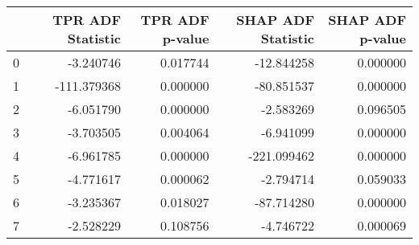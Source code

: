 \begin{tabular}{lrrrr}
\toprule
 & TPR ADF Statistic & TPR ADF p-value & SHAP ADF Statistic & SHAP ADF p-value \\
\midrule
0 & -3.240746 & 0.017744 & -12.844258 & 0.000000 \\
1 & -111.379368 & 0.000000 & -80.851537 & 0.000000 \\
2 & -6.051790 & 0.000000 & -2.583269 & 0.096505 \\
3 & -3.703505 & 0.004064 & -6.941099 & 0.000000 \\
4 & -6.961785 & 0.000000 & -221.099462 & 0.000000 \\
5 & -4.771617 & 0.000062 & -2.794714 & 0.059033 \\
6 & -3.235367 & 0.018027 & -87.714280 & 0.000000 \\
7 & -2.528229 & 0.108756 & -4.746722 & 0.000069 \\
\bottomrule
\end{tabular}
